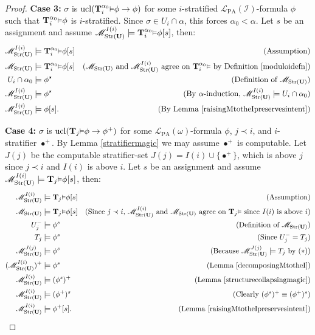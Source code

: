 \documentclass[reqno]{article}
\theoremstyle{definition}
\def\L{\mathscr{L}}
\def\M{\mathscr{M}}
\def\T{\mathbf{T}}
\def\U{\mathbf{U}}
\def\LPA{\L_{\mathrm{PA}}}
\def\indset{\mathcal I}
\renewcommand{\Pr}[1]{\T_{#1}\mbox{\small${\vDash}$}}
\newcommand{\Prr}[2]{\T^{#1}_{#2}\mbox{\small${\vDash}$}}
\newcommand{\ucl}[1]{\mathrm{ucl}(#1)}
\newcommand{\case}[1]{\textbf{Case #1:}}
\newcommand{\str}[1]{\mathrm{Str}(#1)} \newcommand{\Str}[1]{\str{#1}}
\begin{document}
\begin{proof}
\item
\case3
$\sigma$ is $\ucl{\Prr{\alpha_0} i\phi\rightarrow\phi}$ for some
$i$-stratified $\LPA(\indset)$-formula $\phi$ such that $\Prr{\alpha_0}i\phi$ is $i$-stratified.
Since $\sigma\in U_i\cap\alpha$, this forces $\alpha_0<\alpha$.
Let $s$ be an assignment and
assume $\M^{I(i)}_{\str{\U}}\models\Prr{\alpha_0}i\phi[s]$, then:
\begin{align*}
\M^{I(i)}_{\str{\U}} &\models \Prr{\alpha_0} i\phi[s]
  &\mbox{(Assumption)}\\
\M_{\str{\U}} &\models \Prr{\alpha_0} i\phi[s]
  &\mbox{($\M_{\str{\U}}$ and $\M^{I(i)}_{\str{\U}}$ agree on $\Prr{\alpha_0} i$
  by Definition \ref{moduloidefn})}\\
U_i\cap \alpha_0 &\models \phi^s
  &\mbox{(Definition of $\M_{\str{\U}}$)}\\
\M^{I(i)}_{\str{\U}} &\models \phi^s
  &\mbox{(By $\alpha$-induction, $\M^{I(i)}_{\str{\U}}\models U_i\cap \alpha_0$)}\\
\M^{I(i)}_{\str{\U}} &\models \phi[s].
  &\mbox{(By Lemma \ref{raisingMtotheIpreservesintent})}
\end{align*}


\item
\case4
$\sigma$ is $\ucl{\Pr j\phi\rightarrow\phi^+}$ for some $\LPA(\omega)$-formula $\phi$, $j\prec i$,
and $i$-stratifier $\bullet^+$.
By Lemma \ref{stratifiermagic} we may assume $\bullet^+$ is computable.
Let $J(j)$ be the computable stratifier-set $J(j)=I(i)\cup\{\bullet^+\}$, which is above $j$
since $j\prec i$ and $I(i)$ is above $i$.
Let $s$ be an assignment and assume $\M^{I(i)}_{\str{\U}}\models \Pr j\phi[s]$, then:
\begin{align*}
\M^{I(i)}_{\str{\U}} &\models \Pr j\phi[s]
  &\mbox{(Assumption)}\\
\M_{\str{\U}} &\models \Pr j\phi[s]
  &\mbox{(Since $j\prec i$, $\M^{I(i)}_{\str{\U}}$ and $\M_{\str{\U}}$ agree
  on $\Pr j$ since $I(i)$ is above $i$)}\\
U^-_j &\models \phi^s
  &\mbox{(Definition of $\M_{\str{\U}}$)}\\
T_j &\models \phi^s
  &\mbox{(Since $U^-_j=T_j$)}\\
\M^{J(j)}_{\str{\U}} &\models \phi^s
  &\mbox{(Because $\M^{J(j)}_{\str{\U}}\models T_j$ by ($*$))}\\
(\M^{I(i)}_{\str{\U}})^+ &\models \phi^s
  &\mbox{(Lemma \ref{decomposingMtotheI})}\\
\M^{I(i)}_{\str{\U}} &\models (\phi^s)^+
  &\mbox{(Lemma \ref{structurecollapsingmagic})}\\
\M^{I(i)}_{\str{\U}} &\models (\phi^+)^s
  &\mbox{(Clearly $(\phi^s)^+\equiv(\phi^+)^s$)}\\
\M^{I(i)}_{\str{\U}} &\models \phi^+[s].
  &\mbox{(Lemma \ref{raisingMtotheIpreservesintent})}
\end{align*}


\end{proof}
\end{document}
